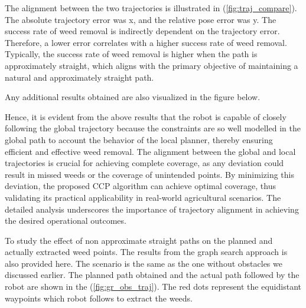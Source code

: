 \vspace*{6mm}   


The alignment between the two trajectories is illustrated in (\autoref{fig:traj_compare}). The absolute trajectory error was x, and the relative pose error was y. The success rate of weed removal is indirectly dependent on the trajectory error. Therefore, a lower error correlates with a higher success rate of weed removal. Typically, the success rate of weed removal is higher when the path is approximately straight, which aligns with the primary objective of maintaining a natural and approximately straight path.

Any additional results obtained are also visualized in the figure below.


Hence, it is evident from the above results that the robot is capable of closely following the global trajectory because the constraints are so well modelled in the global path to account the behavior of the local planner, thereby ensuring efficient and effective weed removal. The alignment between the global and local trajectories is crucial for achieving complete coverage, as any deviation could result in missed weeds or the coverage of unintended points. By minimizing this deviation, the proposed CCP algorithm can achieve optimal coverage, thus validating its practical applicability in real-world agricultural scenarios. The detailed analysis underscores the importance of trajectory alignment in achieving the desired operational outcomes.

\vspace*{6mm}   

To study the effect of non approximate straight paths on the planned and actually extracted weed points. The results from the graph search approach is also provided here. The scenario is the same as the one without obstacles we discussed earlier. The planned path obtained and the actual path followed by the robot are shown in the (\autoref{fig:gr_obs_traj}). The red dots represent the equidistant waypoints which robot follows to extract the weeds.

